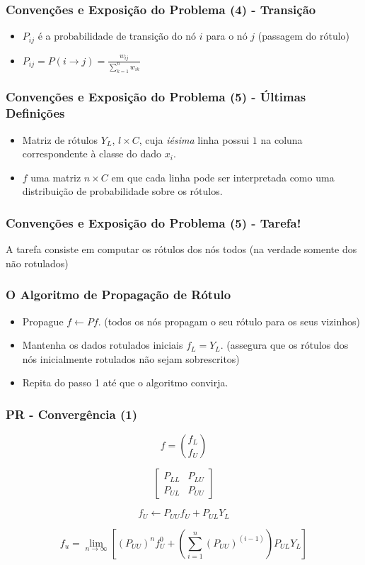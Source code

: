 \documentclass{beamer}
\begin{document}
      \frame
      {
        \frametitle{Convenções e Exposição do Problema (4) - Transição}
        \begin{itemize}
          \item <1-> $P_{ij}$ é a probabilidade de transição do nó $i$ para o nó $j$ (passagem do rótulo)
          \item <2-> $P_{ij} = P(i \rightarrow j) = \frac{w_{ij}}{\sum_{k=1}^{n}w_{ik}}$
        \end{itemize}
      }

      \frame
      {
        \frametitle{Convenções e Exposição do Problema (5) - Últimas Definições}
        \begin{itemize}
          \item <1-> Matriz de rótulos $Y_L$, $l \times C$, cuja \emph{iésima} linha possui $1$ na coluna correspondente à classe do dado $x_i$.
          \item <2-> $f$ uma matriz $n \times C$ em que cada linha pode ser interpretada como uma distribuição de probabilidade sobre os rótulos.
        \end{itemize}
      }

      \frame
      {
        \frametitle{Convenções e Exposição do Problema (5) - Tarefa!}
          A tarefa consiste em computar os rótulos dos nós todos (na verdade somente dos não rotulados)

      }

      \frame
      {
        \frametitle{O Algoritmo de Propagação de Rótulo}
        \begin{itemize}
          \item Propague $f \leftarrow Pf$. (todos os nós propagam o seu rótulo para os seus vizinhos)
          \item Mantenha os dados rotulados iniciais $f_L = Y_L$. (assegura que os rótulos dos nós inicialmente rotulados não sejam sobrescritos)
          \item Repita do passo 1 até que o algoritmo convirja.
        \end{itemize}
      }

      \frame
      {
        \frametitle{PR - Convergência (1)}
          \begin{equation}
            f = \binom{f_L}{f_U}
          \end{equation}

          \begin{equation}
            \begin{bmatrix}
              P_{LL} & P_{LU}
              \\P_{UL} & P_{UU}
            \end{bmatrix}
          \end{equation}

          \begin{equation} \label{eq:inicio}
            f_U \leftarrow P_{UU}f_U + P_{UL}Y_L
          \end{equation}

          \begin{equation}
            f_u = \lim_{n \rightarrow \infty}[(P_{UU})^n f_U^0 + (\sum_{i=1}^{n}(P_{UU})^{(i-1)})P_{UL}Y_L]
          \end{equation}
      }
\end{document}
